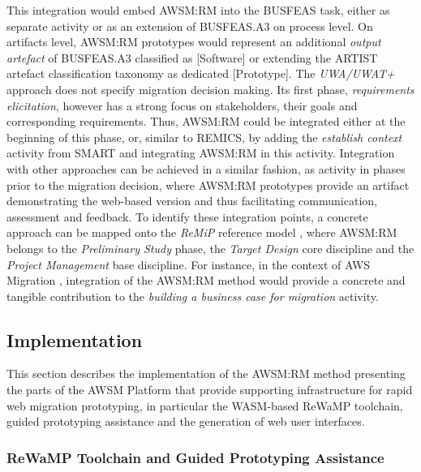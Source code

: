 This integration would embed AWSM:RM into the BUSFEAS task, either as separate activity or as an extension of BUSFEAS.A3 on process level.
On artifacts level, AWSM:RM prototypes would represent an additional \emph{output artefact} of BUSFEAS.A3 classified as {[}Software{]} or extending the ARTIST artefact classification taxonomy as dedicated {[}Prototype{]}.
The \emph{UWA/UWAT+} approach \autocite{Distante2006a,Distante2006CaseStudy} does not specify migration decision making.
Its first phase, \emph{requirements elicitation}, however has a strong focus on stakeholders, their goals and corresponding requirements.
Thus, AWSM:RM could be integrated either at the beginning of this phase, or, similar to REMICS, by adding the \emph{establish context} activity from SMART \autocite{Lewis2008SMART} and integrating AWSM:RM in this activity.
Integration with other approaches can be achieved in a similar fashion, as activity in phases prior to the migration decision, where AWSM:RM prototypes provide an artifact demonstrating the web-based version and thus facilitating communication, assessment and feedback.
To identify these integration points, a concrete approach can be mapped onto the \emph{ReMiP} reference model \autocite{Sneed2010ReMiP,Gipp2007ReMiP}, where AWSM:RM belongs to the \emph{Preliminary Study} phase, the \emph{Target Design} core discipline and the \emph{Project Management} base discipline.
For instance, in the context of AWS Migration \autocite{AmazonWebServices2018Migration}, integration of the AWSM:RM method would provide a concrete and tangible contribution to the \emph{building a business case for migration} activity.

\hypertarget{implementation}{%
\subsection{Implementation}\label{implementation}}

This section describes the implementation of the AWSM:RM method presenting the parts of the AWSM Platform that provide supporting infrastructure for rapid web migration prototyping, in particular the WASM-based ReWaMP toolchain, guided prototyping assistance and the generation of web user interfaces.

\hypertarget{sec:rewamp.implementation}{%
\subsubsection{ReWaMP Toolchain and Guided Prototyping Assistance}\label{sec:rewamp.implementation}}

